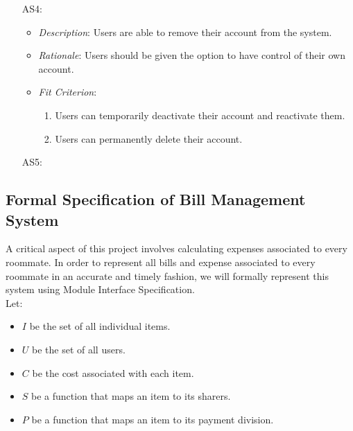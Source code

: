 \documentclass[12pt]{article}
\begin{document}
\begin{itemize}
    \item[AS4:] 
    \begin{itemize}
        \item \textit{Description}: Users are able to remove their account from the system.
        \item \textit{Rationale}: Users should be given the option to have control of their own account.
        \item \textit{Fit Criterion}: 
        \begin{enumerate}
            \item Users can temporarily deactivate their account and reactivate them.
            \item Users can permanently delete their account.
        \end{enumerate}
    \end{itemize}
    \item[AS5:] 
\end{itemize}
\subsection{Formal Specification of Bill Management System}

A critical aspect of this project involves calculating expenses associated to every roommate. In order to represent all bills and expense associated to every roommate in an accurate and timely fashion, we will formally represent this system using Module Interface Specification. \\

Let:

\begin{itemize}
    \item $I$ be the set of all individual items.
    \item $U$ be the set of all users. 
    \item $C$ be the cost associated with each item.
    \item $S$ be a function that maps an item to its sharers.
    \item $P$ be a function that maps an item to its payment division.
\end{itemize}
\end{document}
